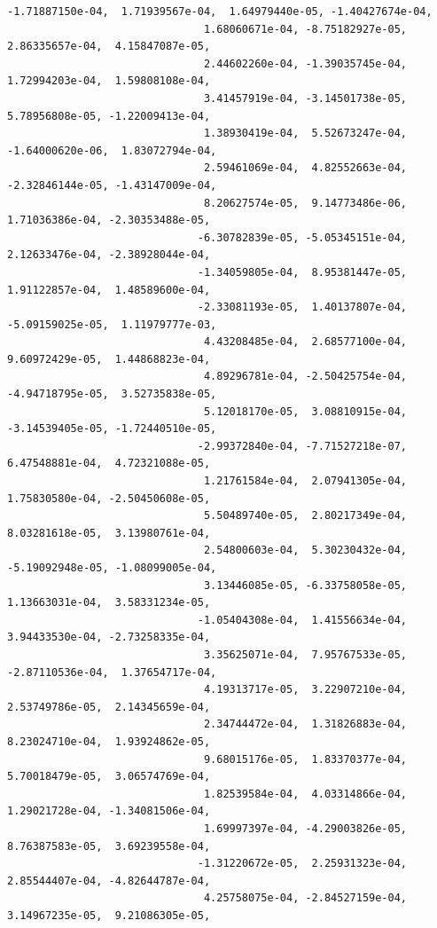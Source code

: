 \documentclass[11pt]{article}
\begin{document}
\begin{Verbatim}[commandchars=\\\{\}]
                              -1.71887150e-04,  1.71939567e-04,  1.64979440e-05, -1.40427674e-04,
                               1.68060671e-04, -8.75182927e-05,  2.86335657e-04,  4.15847087e-05,
                               2.44602260e-04, -1.39035745e-04,  1.72994203e-04,  1.59808108e-04,
                               3.41457919e-04, -3.14501738e-05,  5.78956808e-05, -1.22009413e-04,
                               1.38930419e-04,  5.52673247e-04, -1.64000620e-06,  1.83072794e-04,
                               2.59461069e-04,  4.82552663e-04, -2.32846144e-05, -1.43147009e-04,
                               8.20627574e-05,  9.14773486e-06,  1.71036386e-04, -2.30353488e-05,
                              -6.30782839e-05, -5.05345151e-04,  2.12633476e-04, -2.38928044e-04,
                              -1.34059805e-04,  8.95381447e-05,  1.91122857e-04,  1.48589600e-04,
                              -2.33081193e-05,  1.40137807e-04, -5.09159025e-05,  1.11979777e-03,
                               4.43208485e-04,  2.68577100e-04,  9.60972429e-05,  1.44868823e-04,
                               4.89296781e-04, -2.50425754e-04, -4.94718795e-05,  3.52735838e-05,
                               5.12018170e-05,  3.08810915e-04, -3.14539405e-05, -1.72440510e-05,
                              -2.99372840e-04, -7.71527218e-07,  6.47548881e-04,  4.72321088e-05,
                               1.21761584e-04,  2.07941305e-04,  1.75830580e-04, -2.50450608e-05,
                               5.50489740e-05,  2.80217349e-04,  8.03281618e-05,  3.13980761e-04,
                               2.54800603e-04,  5.30230432e-04, -5.19092948e-05, -1.08099005e-04,
                               3.13446085e-05, -6.33758058e-05,  1.13663031e-04,  3.58331234e-05,
                              -1.05404308e-04,  1.41556634e-04,  3.94433530e-04, -2.73258335e-04,
                               3.35625071e-04,  7.95767533e-05, -2.87110536e-04,  1.37654717e-04,
                               4.19313717e-05,  3.22907210e-04,  2.53749786e-05,  2.14345659e-04,
                               2.34744472e-04,  1.31826883e-04,  8.23024710e-04,  1.93924862e-05,
                               9.68015176e-05,  1.83370377e-04,  5.70018479e-05,  3.06574769e-04,
                               1.82539584e-04,  4.03314866e-04,  1.29021728e-04, -1.34081506e-04,
                               1.69997397e-04, -4.29003826e-05,  8.76387583e-05,  3.69239558e-04,
                              -1.31220672e-05,  2.25931323e-04,  2.85544407e-04, -4.82644787e-04,
                               4.25758075e-04, -2.84527159e-04,  3.14967235e-05,  9.21086305e-05,

\end{Verbatim}
\end{document}
